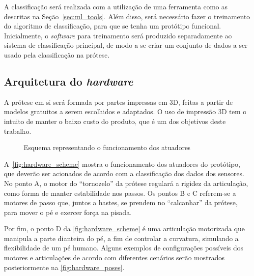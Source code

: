 A classificação será realizada com a utilização de uma ferramenta como as descritas na Seção~\ref{sec:ml_tools}. Além disso, será necessário fazer o treinamento do algoritmo de classificação, para que se tenha um protótipo funcional. Inicialmente, o \textit{software} para treinamento será produzido separadamente ao sistema de classificação principal, de modo a se criar um conjunto de dados a ser usado pela classificação na prótese.

\subsection{Arquitetura do \textit{hardware}}\label{sec:metodo_prot_hardware}
A prótese em si será formada por partes impressas em 3D, feitas a partir de modelos gratuitos a serem escolhidos e adaptados. O uso de impressão 3D tem o intuito de manter o baixo custo do produto, que é um dos objetivos deste trabalho.

\begin{figure}[ht]
	\caption{\label{fig:hardware_scheme}Esquema representando o funcionamento dos atuadores}
	\begin{center}
	\end{center}
\end{figure}

A~\autoref{fig:hardware_scheme} mostra o funcionamento dos atuadores do protótipo, que deverão ser acionados de acordo com a classificação dos dados dos sensores. No ponto A, o motor do ``tornozelo'' da prótese regulará a rigidez da articulação, como forma de manter estabilidade nos passos. Os pontos B e C referem-se a motores de passo que, juntos a hastes, se prendem no ``calcanhar'' da prótese, para mover o pé e exercer força na pisada.

Por fim, o ponto D da \autoref{fig:hardware_scheme} é uma articulação motorizada que manipula a parte dianteira do pé, a fim de controlar a curvatura, simulando a flexibilidade de um pé humano. Alguns exemplos de configurações possíveis dos motores e articulações de acordo com diferentes cenários serão mostrados posteriormente na \autoref{fig:hardware_poses}.

